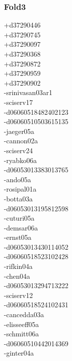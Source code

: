 \begin{multicols}{3}
\subsubsection*{Fold3}
+d37290446\\
+d37290745\\
+d37290097\\
+d37290368\\
+d37290872\\
+d37290959\\
+d37290902\\
-srinivasan03ar1\\
-sciserv17\\
-d06060518482402123\\
-d06060510503615135\\
-jaeger05a\\
-cannon02a\\
-sciserv24\\
-ryabko06a\\
-d06053013383013765\\
-ando05a\\
-rosipal01a\\
-botta03a\\
-d06053013195812598\\
-cuturi05a\\
-demsar06a\\
-ernst05a\\
-d06053013430114052\\
-d06060518523102428\\
-rifkin04a\\
-chen04a\\
-d06053013294713222\\
-sciserv12\\
-d06060518524102431\\
-cancedda03a\\
-elisseeff05a\\
-schmitt06a\\
-d06060510442014369\\
-ginter04a\\

\end{multicols}
